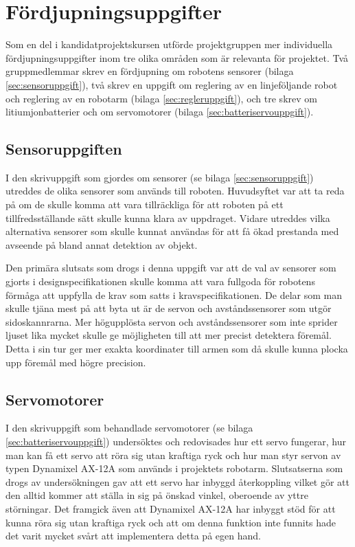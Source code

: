 

\section{Fördjupningsuppgifter}

Som en del i kandidatprojektskursen utförde projektgruppen mer individuella fördjupningsuppgifter inom tre olika områden som är relevanta för projektet. Två gruppmedlemmar skrev en fördjupning om robotens sensorer (bilaga \ref{sec:sensoruppgift}), två skrev en uppgift om reglering av en linjeföljande robot och reglering av en robotarm (bilaga \ref{sec:regleruppgift}), och tre skrev om litiumjonbatterier och om servomotorer (bilaga \ref{sec:batteriservouppgift}). 

\subsection{Sensoruppgiften}

I den skrivuppgift som gjordes om sensorer (se bilaga \ref{sec:sensoruppgift}) utreddes de olika sensorer som används till roboten. Huvudsyftet var att ta reda på om de skulle komma att vara tillräckliga för att roboten på ett tillfredsställande sätt skulle kunna klara av uppdraget. Vidare utreddes vilka alternativa sensorer som skulle kunnat användas för att få ökad prestanda med avseende på bland annat detektion av objekt. 

Den primära slutsats som drogs i denna uppgift var att de val av sensorer som gjorts i designspecifikationen skulle komma att vara fullgoda för robotens förmåga att uppfylla de krav som satts i kravspecifikationen. De delar som man skulle tjäna mest på att byta ut är de servon och avståndssensorer som utgör sidoskannrarna. Mer högupplösta servon och avståndssensorer som inte sprider ljuset lika mycket skulle ge möjligheten till att mer precist detektera föremål. Detta i sin tur ger mer exakta koordinater till armen som då skulle kunna plocka upp föremål med högre precision.

\subsection{Servomotorer}
I den skrivuppgift som behandlade servomotorer (se bilaga \ref{sec:batteriservouppgift}) undersöktes och redovisades hur ett servo fungerar, hur man kan få ett servo att röra sig utan kraftiga ryck och hur man styr servon av typen Dynamixel AX-12A som används i projektets robotarm. Slutsatserna som drogs av undersökningen gav att ett servo har inbyggd återkoppling vilket gör att den alltid kommer att ställa in sig på önskad vinkel, oberoende av yttre störningar. Det framgick även att  Dynamixel AX-12A har inbyggt stöd för att kunna röra sig utan kraftiga ryck och att om denna funktion inte funnits hade det varit mycket svårt att implementera detta på egen hand. 

